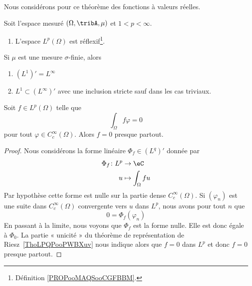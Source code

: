 \begin{theorem}
    Nous considérons pour ce théorème des fonctions à valeurs réelles.

    Soit l'espace mesuré \( (\Omega,\tribA,\mu)\) et \( 1<p<\infty\).
    \begin{enumerate}
        \item
            L'espace \( L^p(\Omega)\) est réflexif\footnote{Définition \ref{PROPooMAQSooCGFBBM}.}.
    \end{enumerate}
    Si \( \mu\) est une mesure \( \sigma\)-finie, alors
    \begin{enumerate}
        \item
            \( (L^1)'=L^{\infty}\)
        \item
            \( L^1\subset (L^{\infty})' \) avec une inclusion stricte sauf dans les cas triviaux.
    \end{enumerate}
\end{theorem}

\begin{proposition} \label{PropUKLZZZh}
    Soit \( f\in L^p(\Omega)\) telle que
    \begin{equation}
        \int_{\Omega}f\varphi=0
    \end{equation}
    pour tout \( \varphi\in C^{\infty}_c(\Omega)\). Alors \( f=0\) presque partout.
\end{proposition}

\begin{proof}
    Nous considérons la forme linéaire \( \Phi_f\in (L^q)'\) donnée par
    \begin{equation}
        \begin{aligned}
            \Phi_f\colon L^p&\to \eC \\
            u&\mapsto \int_{\Omega}fu
        \end{aligned}
    \end{equation}
    Par hypothèse cette forme est nulle sur la partie dense \(  C^{\infty}_c(\Omega)\). Si \( (\varphi_n)\) est une suite dans \(  C^{\infty}_c(\Omega)\) convergente vers \( u\) dans \( L^p\), nous avons pour tout \( n\) que
    \begin{equation}
        0=\Phi_f(\varphi_n)
    \end{equation}
    En passant à la limite, nous voyons que \( \Phi_f\) est la forme nulle. Elle est donc égale à \( \Phi_0\). La partie « unicité » du théorème de représentation de Riesz~\ref{ThoLPQPooPWBXuv} nous indique alors que \( f=0\) dans \( L^p\) et donc \( f=0\) presque partout.
\end{proof}

